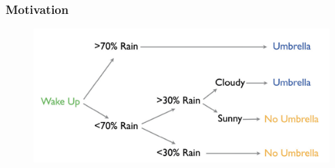 \documentclass[
  shownotes,
  xcolor={svgnames},
  hyperref={colorlinks,citecolor=DarkBlue,linkcolor=DarkRed,urlcolor=DarkBlue}
  , aspectratio=169]{beamer}
\begin{document}
\begin{frame}[fragile]
\frametitle{Motivation}

 \begin{figure}[H] \centering
            \captionsetup{justification=centering}
              \includegraphics[scale=0.15]{figures/cart_intro}                           
 \end{figure}

\end{frame}
\end{document}
